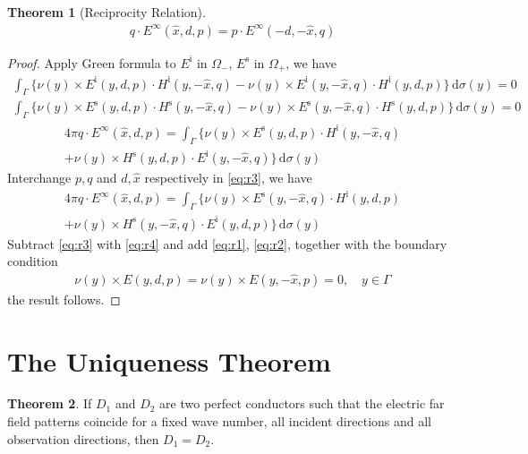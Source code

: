 \documentclass[a4paper,12pt]{article}
\theoremstyle{definition}
\newtheorem{thm}{Theorem}
\newcommand\bdr{\Gamma}
\newcommand\ints[2][y]{\int_{\bdr}#2\,\text{d}\sigma(#1)}
\begin{document}
\begin{thm}[Reciprocity Relation]
  \begin{align*}
    q\cdot E^\infty(\hat{x}, d, p) = p\cdot E^\infty(-d, -\hat{x}, q)
  \end{align*}
\end{thm}

\begin{proof}
  Apply Green formula to $E^\text{i}$ in $\Omega_-$, $E^\text{s}$ in $\Omega_+$, we have
  \begin{align}
    \ints{\bigl\{\nu(y)\times E^\text{i}(y, d, p)\cdot H^\text{i}(y, -\hat{x}, q) - \nu(y)\times E^\text{i}(y, -\hat{x}, q)\cdot H^\text{i}(y, d, p)\bigr\}} = 0 \label{eq:r1} \\ 
    \ints{\bigl\{\nu(y)\times E^\text{s}(y, d, p)\cdot H^\text{s}(y, -\hat{x}, q) - \nu(y)\times E^\text{s}(y, -\hat{x}, q)\cdot H^\text{s}(y, d, p)\bigr\}} = 0 \label{eq:r2}
  \end{align}
  \begin{multline}\label{eq:r3}
    4\pi q\cdot E^\infty(\hat{x}, d, p)=\ints{\bigl\{\nu(y)\times E^\text{s}(y, d, p)\cdot H^\text{i}(y, -\hat{x}, q)\\+\nu(y)\times H^\text{s}(y, d, p)\cdot E^\text{i}(y, -\hat{x}, q)\bigr\}} 
  \end{multline}
  Interchange $p, q$ and $d, \hat{x}$ respectively in \eqref{eq:r3}, we have 
  \begin{multline}\label{eq:r4}
    4\pi q\cdot E^\infty(\hat{x}, d, p)=\ints{\bigl\{\nu(y)\times E^\text{s}(y, -\hat{x}, q)\cdot H^\text{i}(y, d, p)\\+\nu(y)\times H^\text{s}(y, -\hat{x}, q)\cdot E^\text{i}(y, d, p)\bigr\}} 
  \end{multline}
  Subtract \eqref{eq:r3} with \eqref{eq:r4} and add \eqref{eq:r1}, \eqref{eq:r2}, together with the boundary condition 
  \begin{align*}
    \nu(y)\times E(y, d, p)=\nu(y)\times E(y, -\hat{x}, p)=0,\quad y\in\bdr
  \end{align*}
  the result follows. 
\end{proof}

\section{The Uniqueness Theorem}
\begin{thm}
  If $D_1$ and $D_2$ are two perfect conductors such that the electric far field patterns coincide for a fixed wave number, all incident directions and all observation directions, then $D_1=D_2$.
\end{thm}
\end{document}
